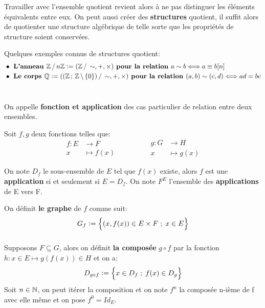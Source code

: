 Travailler avec l'ensemble quotient revient alors à ne pas distinguer les éléments équivalents entre eux.\+
On peut aussi créer des \textbf{structures} quotient, il suffit alors de quotienter une structure algébrique de telle sorte que les propriétés de structure soient conservées.\<

Quelques exemples connus de structures quotient:
\begin{align*}
    &\bullet \textbf{ L'anneau } \mathbb{Z} \,/\, n\mathbb{Z} := (\mathbb{Z} \,/\, \sim, +, \times) \textbf{ pour la relation } a \sim b \Longleftrightarrow a \equiv b [n] \\
    &\bullet \textbf{ Le corps } \mathbb{Q} := ((\mathbb{Z} \, ; \, \mathbb{Z} \, \backslash \, \{0\}) \, / \, \sim, +, \times) \textbf{ pour la relation } (a, b) \sim (c, d) \Longleftrightarrow ad = bc
\end{align*}

\chapter*{}
On appelle \textbf{fonction et application} des cas particulier de relation entre deux ensembles.\<

Soit \(f, g\) deux fonctions telles que:
\[
   \begin{aligned}
      f: E &\longrightarrow F\\
      x &\longmapsto f(x)
   \end{aligned}
      \hspace{50pt}
   \begin{aligned}
      g: G&\longrightarrow H\\
      x&\longmapsto g(x)
   \end{aligned}
\]

On note \(D_f\) le sous-ensemble de \(E\) tel que \(f(x)\) existe, alors \(f\) est une \textbf{application} si et seulement si \(E = D_f\).\+
On note \(F^E\) l'ensemble des \textbf{applications} de E vers F.\<

On définit \textbf{le graphe} de \(f\) comme suit:
\[
   G_f:= \Bigl\{ (x, f(x)) \in E \times F \; ; \; x \in E\Bigl\}   
\]

\subsection*{}
Supposons \(F \subseteq G\), alors on définit \textbf{la composée} \(g \circ f\) par la fonction \(h: x \in E \longmapsto g(f(x)) \in H\) et on a:
\[
   D_{g \circ f} := \Bigl\{ x \in D_f \; ; \; f(x) \in D_g \Bigl\}   
\]
Soit \(n \in \mathbb{N}\), on peut itérer la composition et on note \(f^{n}\) la composée n-ième de f avec elle même et on pose \(f^0 = Id_E\).
